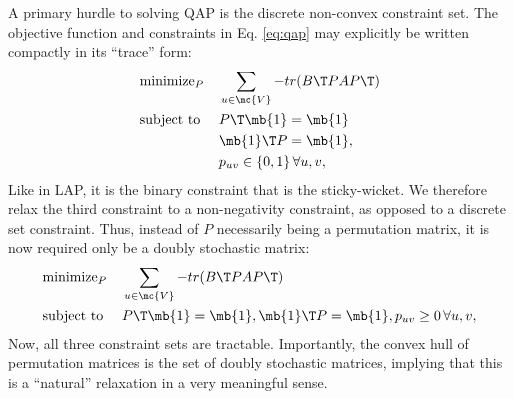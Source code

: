 \documentclass[10pt,journal,cspaper,compsoc]{IEEEtran}
\begin{document}
A primary hurdle to solving QAP is the discrete non-convex constraint set.  The objective function and constraints in Eq. \eqref{eq:qap} may explicitly be written compactly in its ``trace'' form:
\begin{align}
		&\text{minimize}_P  &&\sum_{u \in \mc{V}} - tr(B\T PAP\T) \nonumber \\
		&\text{subject to } &&P\T\mb{1}=\mb{1} \nonumber \\
		& && \mb{1}\T P=\mb{1}, \nonumber \\
		& &&p_{uv} \in \{0,1\} \, \forall u,v, \label{eq:QAP}	
\end{align}
Like in LAP, it is the binary constraint that is the sticky-wicket. We therefore relax the third constraint to a non-negativity constraint, as opposed to a discrete set constraint.  Thus, instead of $P$ necessarily being a permutation matrix, it is now required only be a doubly stochastic matrix:
\begin{align}
		&\text{minimize}_P  &&\sum_{u \in \mc{V}} - tr(B\T PAP\T) \nonumber \\
		&\text{subject to } &&P\T\mb{1}=\mb{1}, %
		\mb{1}\T P=\mb{1}, %
		p_{uv} \geq 0 \, \forall u,v, \label{eq:AQAP}	
\end{align}
Now, all three constraint sets are tractable.  Importantly, the convex hull of permutation matrices is the set of doubly stochastic matrices, implying that this is a ``natural'' relaxation in a very meaningful sense.    

\end{document}

